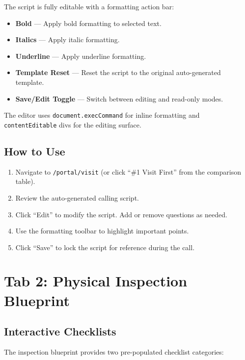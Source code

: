 \documentclass[12pt, a4paper, oneside]{report}
\begin{document}
The script is fully editable with a formatting action bar:

\begin{itemize}[leftmargin=2em]
  \item \textbf{Bold} --- Apply bold formatting to selected text.
  \item \textbf{Italics} --- Apply italic formatting.
  \item \textbf{Underline} --- Apply underline formatting.
  \item \textbf{Template Reset} --- Reset the script to the original auto-generated template.
  \item \textbf{Save/Edit Toggle} --- Switch between editing and read-only modes.
\end{itemize}

The editor uses \texttt{document.execCommand} for inline formatting and \texttt{contentEditable} divs for the editing surface.

\subsection{How to Use}

\begin{enumerate}[leftmargin=2em]
  \item Navigate to \texttt{/portal/visit} (or click ``\#1 Visit First'' from the comparison table).
  \item Review the auto-generated calling script.
  \item Click ``Edit'' to modify the script. Add or remove questions as needed.
  \item Use the formatting toolbar to highlight important points.
  \item Click ``Save'' to lock the script for reference during the call.
\end{enumerate}

\section{Tab 2: Physical Inspection Blueprint}

\subsection{Interactive Checklists}

The inspection blueprint provides two pre-populated checklist categories:
\end{document}
